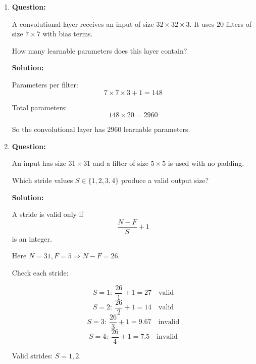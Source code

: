 \documentclass{article}
\begin{document}
\begin{enumerate}
Final output volume:
\[
28 \times 28 \times 16
\]

\item \textbf{Question:}

A convolutional layer receives an input of size \(32 \times 32 \times 3\).  
It uses \(20\) filters of size \(7 \times 7\) with bias terms.

How many learnable parameters does this layer contain?

\textbf{Solution:}

Parameters per filter:
\[
7 \times 7 \times 3 + 1 = 148
\]

Total parameters:
\[
148 \times 20 = 2960
\]

So the convolutional layer has \(\boxed{2960}\) learnable parameters.

\item \textbf{Question:}

An input has size \(31 \times 31\) and a filter of size \(5 \times 5\) is used with no padding.

Which stride values \(S \in \{1,2,3,4\}\) produce a valid output size?

\textbf{Solution:}

A stride is valid only if
\[
\frac{N - F}{S} + 1
\]
is an integer.

Here \(N=31, F=5\Rightarrow N-F=26\).

Check each stride:

\[
S=1:\ \frac{26}{1}+1=27 \quad \text{valid}
\]
\[
S=2:\ \frac{26}{2}+1=14 \quad \text{valid}
\]
\[
S=3:\ \frac{26}{3}+1=9.67 \quad \text{invalid}
\]
\[
S=4:\ \frac{26}{4}+1=7.5 \quad \text{invalid}
\]

Valid strides: \(\boxed{S=1,2}\).

\end{enumerate}
\end{document}

